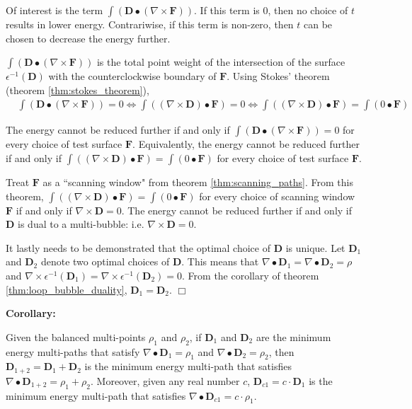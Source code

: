Of interest is the term \(\int (\mathbf{D} \bullet (\nabla \times \mathbf{F}))\). If this term is \(0\), then no choice of \(t\) results in lower energy. Contrariwise, if this term is non-zero, then \(t\) can be chosen to decrease the energy further. 

\(\int (\mathbf{D} \bullet (\nabla \times \mathbf{F}))\) is the total point weight of the intersection of the surface \(\epsilon^{-1}(\mathbf{D})\) with the counterclockwise boundary of \(\mathbf{F}\). Using Stokes' theorem (theorem \ref{thm:stokes_theorem}), 
\begin{align*}
& \int (\mathbf{D} \bullet (\nabla \times \mathbf{F})) = 0
\iff \int ((\nabla \times \mathbf{D}) \bullet \mathbf{F}) = 0 
\iff \int ((\nabla \times \mathbf{D}) \bullet \mathbf{F}) = \int (0 \bullet \mathbf{F}) 
\end{align*}

The energy cannot be reduced further if and only if \(\int (\mathbf{D} \bullet (\nabla \times \mathbf{F})) = 0\) for every choice of test surface \(\mathbf{F}\). Equivalently, the energy cannot be reduced further if and only if \(\int ((\nabla \times \mathbf{D}) \bullet \mathbf{F}) = \int (0 \bullet \mathbf{F})\) for every choice of test surface \(\mathbf{F}\).

Treat \(\mathbf{F}\) as a ``scanning window" from theorem \ref{thm:scanning_paths}. From this theorem, \(\int ((\nabla \times \mathbf{D}) \bullet \mathbf{F}) = \int (0 \bullet \mathbf{F})\) for every choice of scanning window \(\mathbf{F}\) if and only if \(\nabla \times \mathbf{D} = 0\). The energy cannot be reduced further if and only if \(\mathbf{D}\) is dual to a multi-bubble: i.e. \(\nabla \times \mathbf{D} = 0\).

It lastly needs to be demonstrated that the optimal choice of \(\mathbf{D}\) is unique. Let \(\mathbf{D}_1\) and \(\mathbf{D}_2\) denote two optimal choices of \(\mathbf{D}\). This means that \(\nabla \bullet \mathbf{D}_1 = \nabla \bullet \mathbf{D}_2 = \rho\) and \(\nabla \times \epsilon^{-1}(\mathbf{D}_1) = \nabla \times \epsilon^{-1}(\mathbf{D}_2) = 0\). From the corollary of theorem \ref{thm:loop_bubble_duality}, \(\mathbf{D}_1 = \mathbf{D}_2\). \(\Box\) 

\textbf{Corollary:}

Given the balanced multi-points \(\rho_1\) and \(\rho_2\), if \(\mathbf{D}_1\) and \(\mathbf{D}_2\) are the minimum energy multi-paths that satisfy \(\nabla \bullet \mathbf{D}_1 = \rho_1\) and \(\nabla \bullet \mathbf{D}_2 = \rho_2\), then \(\mathbf{D}_{1+2} = \mathbf{D}_1 + \mathbf{D}_2\) is the minimum energy multi-path that satisfies \(\nabla \bullet \mathbf{D}_{1+2} = \rho_1 + \rho_2\). Moreover, given any real number \(c\), \(\mathbf{D}_{c1} = c \cdot \mathbf{D}_1\) is the minimum energy multi-path that satisfies \(\nabla \bullet \mathbf{D}_{c1} = c \cdot \rho_1\).

